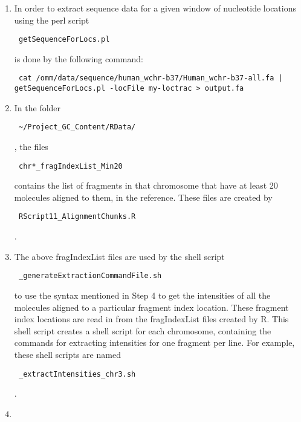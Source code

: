 \documentclass[11pt]{article}
\begin{document}
\begin{enumerate}
\item
In order to extract sequence data for a given window of nucleotide locations using the perl script \begin{verbatim} getSequenceForLocs.pl \end{verbatim} 
is done by the following command:
\begin{verbatim} cat /omm/data/sequence/human_wchr-b37/Human_wchr-b37-all.fa | 
getSequenceForLocs.pl -locFile my-loctrac > output.fa \end{verbatim}

\item
In the folder \begin{verbatim} ~/Project_GC_Content/RData/ \end{verbatim}, 
the files \begin{verbatim} chr*_fragIndexList_Min20 \end{verbatim} 
contains the list of fragments in that chromosome that have at least 20 molecules aligned to them, in the reference. These files are created by \begin{verbatim} RScript11_AlignmentChunks.R \end{verbatim}. 

\item
The above fragIndexList files are used by the shell script \begin{verbatim} _generateExtractionCommandFile.sh \end{verbatim}
to use the syntax mentioned in Step 4 to get the intensities of all the molecules aligned to a particular fragment index location. These fragment index locations are read in from the fragIndexList files created by R. This shell script creates a shell script for each chromosome, containing the commands for extracting intensities for one fragment per line. For example, these shell scripts are named \begin{verbatim} _extractIntensities_chr3.sh \end{verbatim}.

\item
\end{enumerate}
\end{document}

